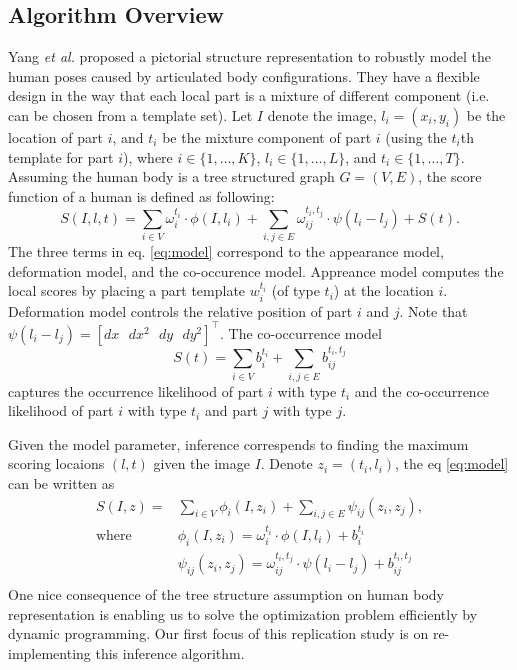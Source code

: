 \documentclass[10pt,twocolumn,letterpaper]{article}
\begin{document}
\subsection{Algorithm Overview}
\label{sec:inference_ov}
Yang \emph{et al.} proposed a pictorial structure representation to robustly model the human poses caused by articulated body configurations. They have a flexible design in the way that each local part is a mixture of different component (i.e. can be chosen from a template set). Let $I$ denote the image, $l_i = (x_i, y_i)$ be the location of part $i$, and $t_i$ be the mixture component of part $i$ (using the $t_i$th template for part $i$), where $i\in \{1,\dots,K\}$, $l_i\in\{1,\dots,L\}$, and $t_i\in\{1,\dots,T\}$. Assuming the human body is a tree structured graph $G=(V,E)$, the score function of a human is defined as following:
\begin{equation}
\label{eq:model}
  S(I,l,t) = \sum_{i\in V}\omega_i^{t_i}\cdot\phi(I,l_i) + \sum_{i,j\in E}\omega_{ij}^{t_i,t_j}\cdot\psi(l_i-l_j) + S(t).
\end{equation}
The three terms in eq. \ref{eq:model} correspond to the appearance model, deformation model, and the co-occurence model. Appreance model computes the local scores by placing a part template $w_i^{t_i}$ (of type $t_i$) at the location $i$. Deformation model controls the relative position of part $i$ and $j$. Note that $\psi(l_i-l_j)=[dx\text{~~}dx^{2}\text{~~}dy\text{~~}dy^{2}]^{\top}$. The co-occurrence model 
\begin{equation}
  S(t) = \sum_{i\in V}b_i^{t_i} + \sum_{i,j\in E}b_{ij}^{t_i,t_j}
\end{equation}
captures the occurrence likelihood of part $i$ with type $t_i$ and the co-occurrence likelihood of part $i$ with type $t_i$ and part $j$ with type $j$.

Given the model parameter, inference correspends to finding the maximum scoring locaions $(l,t)$ given the image $I$. Denote $z_i = (t_i,l_i)$, the eq \ref{eq:model} can be written as
\begin{equation}
  \begin{split}
    S(I,z) = & \sum_{i\in V}\phi_i(I,z_i) + \sum_{i,j\in E}\psi_{ij}(z_i,z_j), \\
    \text{where~~~~} & \phi_i(I,z_i) = \omega_i^{t_i}\cdot\phi(I,l_i)+b_i^{t_i} \\
                   & \psi_{ij}(z_i,z_j) = \omega_{ij}^{t_i,t_j}\cdot\psi(l_i-l_j)+b_{ij}^{t_i,t_j} \\
  \end{split}
\end{equation}
One nice consequence of the tree structure assumption on human body representation is enabling us to solve the optimization problem efficiently by dynamic programming.	Our first focus of this replication study is on re-implementing this inference algorithm.
\end{document}
